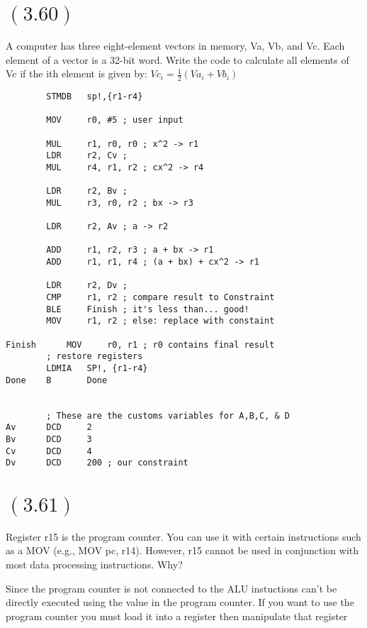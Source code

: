 \documentclass[letterpaper,12pt,titlepage]{article}
\begin{document}
\section*{$(3.60)$} A computer has three eight-element vectors in memory, Va, Vb, and Vc. Each element of a vector is a 32-bit word. Write the code to calculate all elements of Vc if the ith element is given by: $Vc_i = \frac{1}{2} ( Va_i + Vb_i)$
\begin{mdframed}[style=MyFrame]
\begin{verbatim}
		STMDB 	sp!,{r1-r4}

		MOV 	r0, #5 ; user input
				
		MUL		r1, r0, r0 ; x^2 -> r1
		LDR		r2, Cv ;
		MUL		r4, r1, r2 ; cx^2 -> r4
		
		LDR		r2, Bv ;
		MUL		r3, r0, r2 ; bx -> r3
		
		LDR 	r2, Av ; a -> r2
		
		ADD 	r1, r2, r3 ; a + bx -> r1
		ADD 	r1, r1, r4 ; (a + bx) + cx^2 -> r1
		
		LDR		r2, Dv ; 
		CMP 	r1, r2 ; compare result to Constraint
		BLE		Finish ; it's less than... good!
		MOV		r1, r2 ; else: replace with constaint

Finish		MOV		r0, r1 ; r0 contains final result
		; restore registers
		LDMIA  	SP!, {r1-r4}
Done	B		Done		
		
		
		; These are the customs variables for A,B,C, & D
Av   	DCD  	2
Bv   	DCD  	3
Cv   	DCD  	4
Dv		DCD		200 ; our constraint
\end{verbatim}
\end{mdframed}
\newpage

\section*{$(3.61)$} Register r15 is the program counter. You can use it with certain instructions such as a MOV (e.g., MOV pc, r14). However, r15 cannot be used in conjunction with most data processing instructions. Why?

\begin{mdframed}[style=MyFrame]
Since the program counter is not connected to the ALU instuctions can't be directly executed using the value in the program counter. If you want to use the program counter you must load it into a register then manipulate that register
\end{mdframed}



\end{document}
